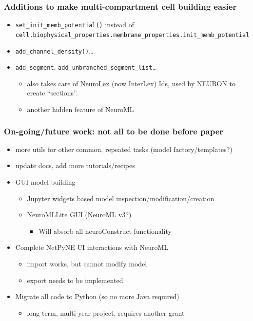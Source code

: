 \begin{frame}[t,fragile]
  \frametitle{Additions to make multi-compartment cell building easier}
  \begin{itemize}
    \item \texttt{set_init_memb_potential()} instead of \texttt{cell.biophysical_properties.membrane_properties.init_memb_potential}
    \item \texttt{add_channel_density()}\ldots
    \item \texttt{add_segment}, \texttt{add_unbranched_segment_list}\ldots
      \begin{itemize}
        \item also takes care of \href{https://scicrunch.org/scicrunch/interlex/dashboard}{NeuroLex} (now InterLex) Ids, used by NEURON to create \enquote{sections}.
        \item another hidden feature of NeuroML
      \end{itemize}
  \end{itemize}
\end{frame}
\begin{frame}[t]
  \frametitle{On-going/future work: not all to be done before paper}
  \begin{itemize}
    \item more utils for other common, repeated tasks (model factory/templates?)
    \item update docs, add more tutorials/recipes
      \pause{}
    \item GUI model building
      \begin{itemize}
        \item Jupyter widgets based model inspection/modification/creation
        \item NeuroMLLite GUI (NeuroML v3?)
          \begin{itemize}
            \item Will absorb all neuroConstruct functionality
          \end{itemize}
      \end{itemize}
      \pause{}
    \item Complete NetPyNE UI interactions with NeuroML
      \begin{itemize}
        \item import works, but cannot modify model
        \item export needs to be implemented
      \end{itemize}
      \pause{}
    \item Migrate all code to Python (so no more Java required)
      \begin{itemize}
        \item long term, multi-year project, requires another grant
      \end{itemize}
  \end{itemize}
\end{frame}


